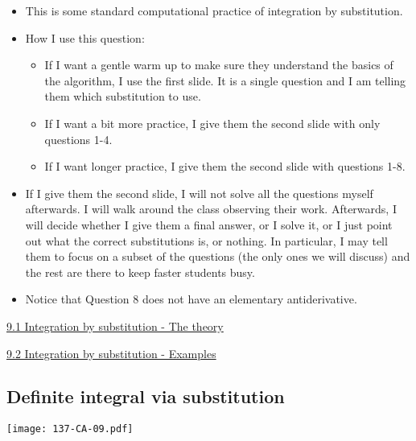 \documentclass[11pt]{article}
\newcommand{\nl}{\hfill \vspace{-1.1\baselineskip}} %
\newcommand{\vi}{\hspace{8mm} \href{https://www.youtube.com/watch?v=6IiHC3-E3kQ&list=PLlwePzQY_wW_DPAQSBjQmMs0hF8T7yVkF&index=1}{9.1 Integration by substitution - The theory}}
\newcommand{\vii}{\hspace{8mm} \href{https://www.youtube.com/watch?v=dS50LonV_ms&list=PLlwePzQY_wW_DPAQSBjQmMs0hF8T7yVkF&index=2}{9.2 Integration by substitution - Examples}}
\begin{document}
\begin{comments}
\nl
	\begin{itemize}
		\item This is some standard computational practice of integration by substitution.
		\item  How I use this question:
			\begin{itemize}
				\item If I want a gentle warm up to make sure they understand the basics of the algorithm, I use the first slide.  It is a single question and I am telling them which substitution to use.
				\item  If I want a bit more practice, I give them the second slide with only questions 1-4.  
				\item  If I want longer practice, I give them the second slide with questions 1-8.
			\end{itemize}
		\item If I give them the second slide, I will not solve all the questions myself afterwards.  I will walk around the class observing their work.  Afterwards, I will decide whether I give them a final answer, or I solve it, or I just point out what the correct substitutions is, or nothing.  In particular, I may tell them to focus on a subset of the questions (the only ones we will discuss) and the rest are there to keep faster students busy.
		\item Notice that Question 8 does not have an elementary antiderivative.
	\end{itemize}
\end{comments}

\begin{videos}
\vi

\vii
\end{videos}

\newpage
\subsection{Definite integral via substitution}

\begin{center}
{ \texttt{[image: 137-CA-09.pdf]}} 
\end{center}
\end{document}

